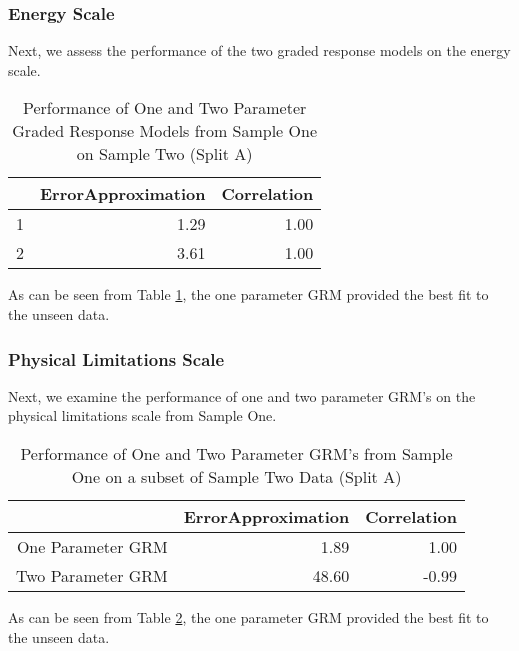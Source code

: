 \documentclass{article}
\begin{document}
\subsubsection{Energy Scale}
\label{sec:energy-scale}




Next, we assess the performance of the two graded response models on the energy scale.

\begin{table}[ht]
\centering
\begin{tabular}{rrr}
  \hline
 & ErrorApproximation & Correlation \\ 
  \hline
1 & 1.29 & 1.00 \\ 
  2 & 3.61 & 1.00 \\ 
   \hline
\end{tabular}
\caption{Performance of One and Two Parameter Graded Response Models from Sample One on Sample Two (Split A)} 
\label{tab:hom1energygrmtest}
\end{table}
As can be seen from Table \ref{tab:hom1energygrmtest}, the one parameter GRM provided the best fit to the unseen data. 

\subsubsection{Physical Limitations Scale}
\label{sec:phys-limit-scale}

Next, we examine the performance of one and two parameter GRM's on the physical limitations scale from Sample One. 

\begin{table}[ht]
\centering
\begin{tabular}{rrr}
  \hline
 & ErrorApproximation & Correlation \\ 
  \hline
One Parameter GRM & 1.89 & 1.00 \\ 
  Two Parameter GRM & 48.60 & -0.99 \\ 
   \hline
\end{tabular}
\caption{Performance of One and Two Parameter GRM's from Sample One on a subset of Sample Two Data (Split A)} 
\label{tab:hom1physlimgrmtest}
\end{table}
As can be seen from Table \ref{tab:hom1physlimgrmtest}, the one parameter GRM provided the best fit to the unseen data. 
\end{document}
